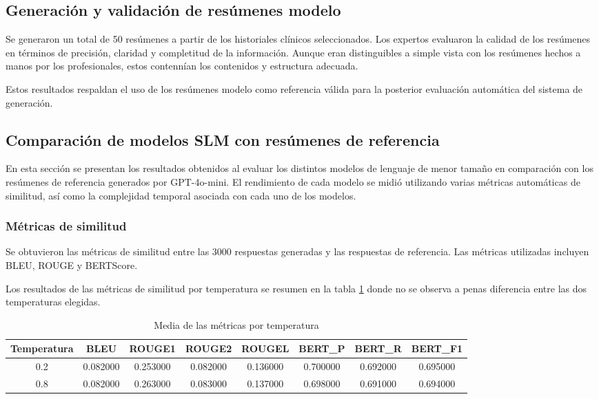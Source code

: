 \documentclass[../main.tex]{subfiles}
\begin{document}
\subsection{Generación y validación de resúmenes modelo}

Se generaron un total de 50 resúmenes a partir de los historiales clínicos seleccionados.
Los expertos evaluaron la calidad de los resúmenes en términos de precisión, claridad y completitud de la información. Aunque eran distinguibles a simple vista con los resúmenes hechos a manos por los profesionales, estos contennían los contenidos y estructura adecuada.

Estos resultados respaldan el uso de los resúmenes modelo como referencia válida para la posterior evaluación automática del sistema de generación.

\subsection{Comparación de modelos SLM con resúmenes de referencia}

En esta sección se presentan los resultados obtenidos al evaluar los distintos modelos de lenguaje de menor tamaño en comparación con los resúmenes de referencia generados por GPT-4o-mini. El rendimiento de cada modelo se midió utilizando varias métricas automáticas de similitud, así como la complejidad temporal asociada con cada uno de los modelos.

\subsubsection{Métricas de similitud}

Se obtuvieron las métricas de similitud entre las 3000 respuestas generadas y las respuestas de referencia. Las métricas utilizadas incluyen BLEU, ROUGE y BERTScore.

Los resultados de las métricas de similitud por temperatura se resumen en la tabla \ref{tab:metricas_temperatura} donde no se observa a penas diferencia entre las dos temperaturas elegidas. 

\begin{table}[H]
    \centering
    \caption{Media de las métricas por temperatura}
    \label{tab:metricas_temperatura}
    \renewcommand{\arraystretch}{1.2}
    \begin{tabular}{c|ccccccc}
        \hline
        \textbf{Temperatura} & \textbf{BLEU} & \textbf{ROUGE1} & \textbf{ROUGE2} & \textbf{ROUGEL} & \textbf{BERT\_P} & \textbf{BERT\_R} & \textbf{BERT\_F1} \\
        \hline
        0.2 & 0.082000 & 0.253000 & 0.082000 & 0.136000 & 0.700000 & 0.692000 & 0.695000 \\
        0.8 & 0.082000 & 0.263000 & 0.083000 & 0.137000 & 0.698000 & 0.691000 & 0.694000 \\
        \hline
    \end{tabular}

\end{table}
\end{document}
